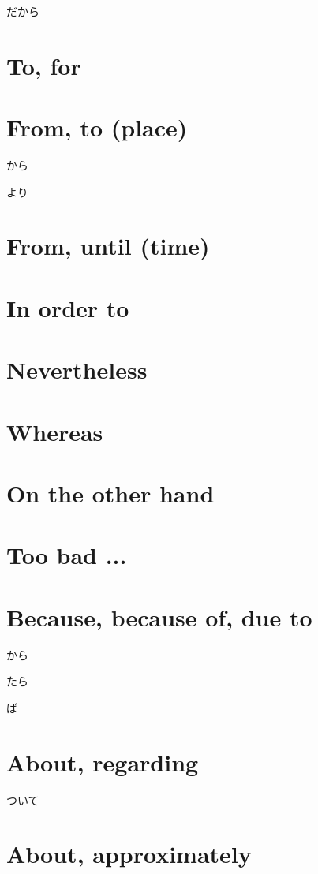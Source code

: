 だから

\section{To, for}

\section{From, to (place)}

から

より

\section{From, until (time)}

\section{In order to}

\section{Nevertheless}

\section{Whereas}

\section{On the other hand}

\section{Too bad ...}

\section{Because, because of, due to}

から

たら

ば

\section{About, regarding}

ついて

\section{About, approximately}

